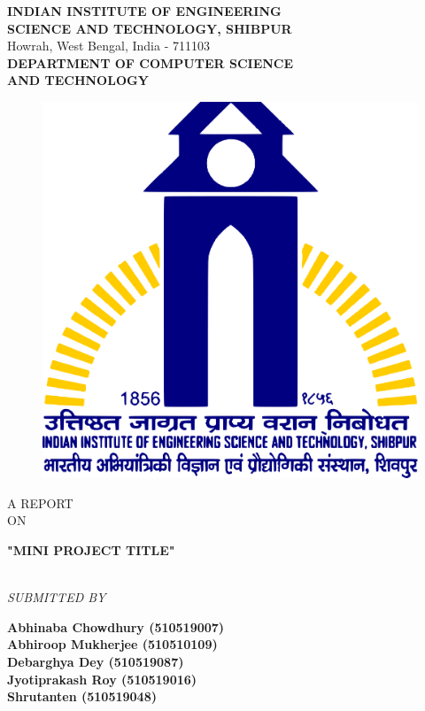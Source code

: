 \documentclass[a4paper, 12pt]{report}
\begin{document}
\begin{titlepage}

    \begin{center}

        \textup{\large  \textbf{INDIAN INSTITUTE OF ENGINEERING}\\\textbf{SCIENCE AND TECHNOLOGY, SHIBPUR}}\\ Howrah, West Bengal, India - 711103\\[0.5cm]\textbf{\large DEPARTMENT OF COMPUTER SCIENCE}\\\textbf{\large AND TECHNOLOGY}

        \begin{center}
            \begin{figure}[h]   %
                \centering
                \includegraphics[width=0.3\linewidth]{Pictures/IIESTS Logo.png}
            \end{figure}
        \end{center}


        \textup{\large A REPORT\\[0.4cm]ON}\\[0.4cm]

        \begin{LARGE}
            {\textbf {"MINI PROJECT TITLE" }}
        \end{LARGE}\\[1cm]

        \textit{SUBMITTED BY}\\[0.3cm]
        \begin{large}
            \textbf{Abhinaba Chowdhury (510519007)}\\[0.1cm]
            \textbf{Abhiroop Mukherjee (510510109)}\\[0.1cm]
            \textbf{Debarghya Dey (510519087)}\\[0.1cm]
            \textbf{Jyotiprakash Roy (510519016)}\\[0.1cm]
            \textbf{Shrutanten (510519048)}\\[1cm]
        \end{large}


\end{center}
\end{titlepage}
\end{document}
